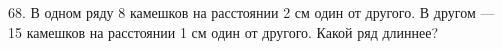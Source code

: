68. В одном ряду 8 камешков на расстоянии 2 см один от другого. В другом --- 15 камешков на расстоянии 1 см один от другого. Какой ряд длиннее?\\
